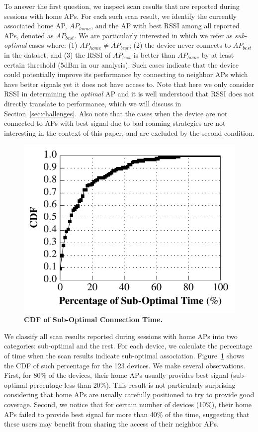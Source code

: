 To answer the first question, we inspect scan results that are reported during
\wifi{} sessions with home APs. For each such scan result, we identify the
currently associated home AP, $AP_{home}$, and the AP with best RSSI among all
reported APs, denoted as $AP_{best}$. We are particularly interested in which we
refer as \textit{sub-optimal} cases where: (1) $AP_{home} \neq AP_{best}$; (2)
the device never connects to $AP_{best}$ in the dataset; and (3) the RSSI of
$AP_{best}$ is better than $AP_{home}$ by at least certain threshold (5dBm in
our analysis). Such cases indicate that the device could potentially improve its
\wifi{} performance by connecting to neighbor APs which have better signals yet it
does not have access to. Note that here we only consider RSSI in determining the
\textit{optimal} AP and it is well understood that RSSI does not directly translate
to \wifi{} performance, which we will discuss in Section~\ref{sec:challenges}.
Also note that the cases when the device are not connected to APs with best
signal due to bad roaming strategies are not interesting in the context of this
paper, and are excluded by the second condition.

\begin{figure}[t]
  \centering
  \includegraphics[width=\columnwidth]{./figures/HomeAPSessionRSSI.pdf}
  \caption{\textbf{CDF of Sub-Optimal Connection Time.}}
  \label{fig:suboptimal}
\end{figure}

We classify all scan results reported during \wifi{} sessions with home APs into
two categories: sub-optimal and the rest. For each device, we calculate the
percentage of time when the scan results indicate sub-optimal association.
Figure~\ref{fig:suboptimal} shows the CDF of such percentage for 
the 123 devices. We make several observations. First, for 80\% of the devices,
their home APs usually provides best signal (sub-optimal percentage less than
20\%). This result is not particularly surprising considering that home APs are
usually carefully positioned to try to provide good coverage. Second, we notice
that for certain number of devices (10\%), their home APs failed to provide best
signal for more than 40\% of the time, suggesting that these users may benefit
from sharing the \wifi{} access of their neighbor APs.

